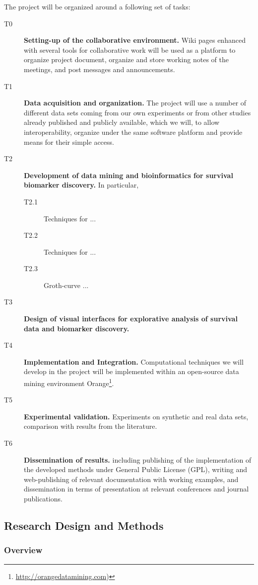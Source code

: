 \documentclass[11pt,a4paper]{article}
\renewcommand{\bold}{\textbf}
\begin{document}
The project will be organized around a following set of tasks:
\begin{description}
	\item[T0] \bold{Setting-up of the collaborative environment.} Wiki pages enhanced with several tools for collaborative work will be used as a platform to organize project document, organize and store working notes of the meetings, and post messages and announcements.
	\item[T1] \bold{Data acquisition and organization.} The project will use a number of different data sets coming from our own experiments or from other studies already published and publicly available, which we will, to allow interoperability, organize under the same software platform and provide means for their simple access.
	\item[T2] \bold{Development of data mining and bioinformatics for survival biomarker discovery.} In particular,
	\begin{description}
		\item[T2.1] Techniques for ...
		\item[T2.2] Techniques for ...
		\item[T2.3] Groth-curve ...
	\end{description}
	\item[T3] \bold{Design of visual interfaces for explorative analysis of survival data and biomarker discovery.}
	\item[T4] \bold{Implementation and Integration.} Computational techniques we will develop in the project will be implemented within an open-source data mining environment Orange\footnote{\url{http://orangedatamining.com})}.
	\item[T5] \bold{Experimental validation.} Experiments on synthetic and real data sets, comparison with results from the literature.
	\item[T6] \bold{Dissemination of results.} including publishing of the implementation of the developed methods under General Public License (GPL), writing and web-publishing of relevant documentation with working examples, and dissemination in terms of presentation at relevant conferences and journal publications.
\end{description}

\subsection{Research Design and Methods}
\subsubsection{Overview}
\end{document}
